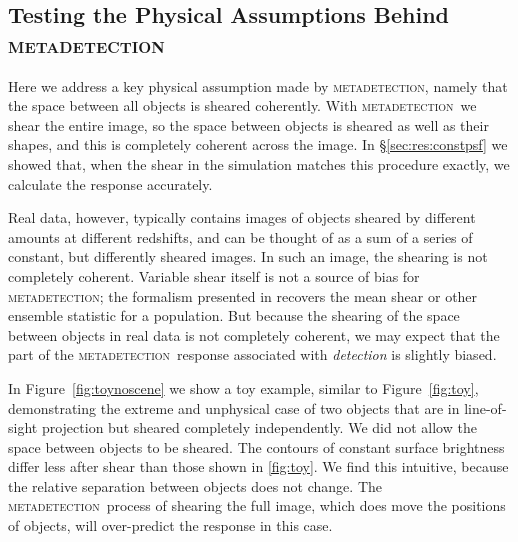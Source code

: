 \documentclass[iop, twocolappendix, appendixfloats, numberedappendix, apj]{hackemulateapj}
\newcommand{\mdet}{\textsc{metadetection}}
\begin{document}
\subsection{Testing the Physical Assumptions Behind \mdet}
\label{sec:mdetphys}

Here we address a key physical assumption made by \mdet, namely that the space
between all objects is sheared coherently.   With \mdet\ we shear the entire
image, so the space between objects is sheared as well as their shapes, and this
is completely coherent across the image.  In \S \ref{sec:res:constpsf} we
showed that, when the shear in the simulation matches this procedure exactly,
we calculate the response accurately.

Real data, however, typically contains images of objects sheared by different
amounts at different redshifts, and can be thought of as a sum of a series of
constant, but differently sheared images.  In such an image, the shearing is
not completely coherent.  Variable shear itself is not a source of bias for
\mdet; the formalism presented in \citep{SheldonMcal2017} recovers the mean
shear or other ensemble statistic for a population.  But because the shearing
of the space between objects in real data is not completely coherent, we may
expect that the part of the \mdet\ response associated with {\em detection} is
slightly biased.

In Figure~\ref{fig:toynoscene} we show a toy example, similar to
Figure~\ref{fig:toy}, demonstrating the extreme and unphysical case of two
objects that are in line-of-sight projection but sheared completely
independently.  We did not allow the space between objects to be sheared. The
contours of constant surface brightness differ less after shear than those
shown in \ref{fig:toy}.  We find this intuitive, because the relative separation
between objects does not change.  The \mdet\ process of shearing the full
image, which does move the positions of objects, will over-predict the response
in this case.
\end{document}
